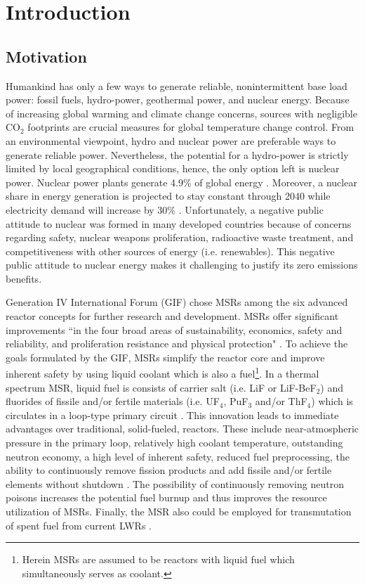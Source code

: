\chapter[Introduction]{Introduction}
\section{Motivation}
Humankind has only a few ways to generate reliable, nonintermittent 
base load power: fossil fuels, hydro-power, geothermal power, and 
nuclear energy. Because of increasing global warming and climate 
change concerns, sources with negligible CO$_2$ footprints 
are crucial measures for global temperature change control. 
From an environmental viewpoint, hydro and nuclear power are 
preferable ways to generate reliable power. Nevertheless, the 
potential for a hydro-power is strictly limited by local geographical 
conditions, hence, the only option left is nuclear power. Nuclear 
power plants generate 4.9\% of global energy \cite{noauthor_key_2017}. 
Moreover, a nuclear share in energy generation is projected to stay 
constant through 2040 while electricity demand will 
increase by 30\% \cite{noauthor_world_2017}. Unfortunately, a negative 
public attitude to nuclear was formed in many developed countries 
because of concerns regarding safety, nuclear weapons 
proliferation, radioactive waste treatment, and competitiveness with 
other sources of energy (i.e. renewables). This negative public 
attitude to nuclear energy makes it challenging to justify its zero 
emissions benefits.

Generation IV International Forum (GIF) chose \glspl{MSR} among the 
six advanced reactor concepts for further research and development. 
\glspl{MSR} 
offer significant improvements ``in the four broad areas of 
sustainability, economics, safety and reliability, and proliferation 
resistance and physical protection" \cite{doe_technology_2002}. To 
achieve the goals formulated by the GIF, \glspl{MSR} 
simplify the reactor core and improve inherent safety by using 
liquid coolant which is also a fuel\footnote{Herein \glspl{MSR} are 
assumed to be reactors with liquid fuel which simultaneously serves 
as coolant.}. In a thermal spectrum \gls{MSR}, liquid fuel is consists 
of carrier salt (i.e. LiF or LiF-BeF$_2$) and fluorides of fissile 
and/or fertile materials (i.e. UF$_4$, PuF$_3$ and/or ThF$_4$) 
which is circulates in a loop-type primary circuit 
\cite{haubenreich_experience_1970}. 
This innovation leads to immediate advantages over traditional, 
solid-fueled, reactors. These include near-atmospheric pressure 
in the primary loop, relatively high coolant temperature, outstanding 
neutron economy, a high level of inherent safety, reduced fuel 
preprocessing, the ability to continuously remove fission products 
and add fissile and/or fertile elements without shutdown 
\cite{leblanc_molten_2010}. The possibility of continuously removing 
neutron poisons increases the potential fuel burnup and thus 
improves the resource utilization of \glspl{MSR}. Finally, the \gls{MSR} 
also could be employed for transmutation of 
spent fuel from current \glspl{LWR} \cite{fratoni_design_2004}.

